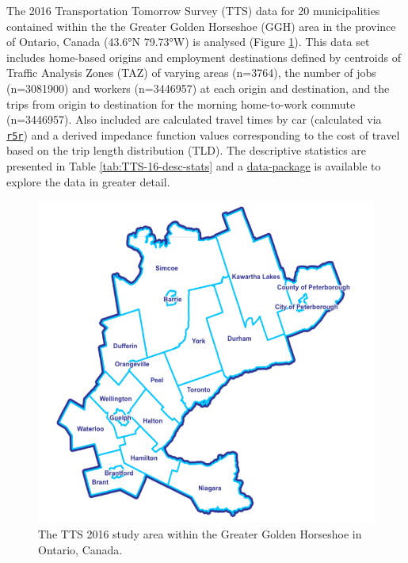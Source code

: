 \documentclass[]{elsarticle} %
\begin{document}
The 2016 Transportation Tomorrow Survey (TTS) data for 20 municipalities
contained within the the Greater Golden Horseshoe (GGH) area in the
province of Ontario, Canada (43.6°N 79.73°W) is analysed (Figure
\ref{fig:TTS-16-survey-area}). This data set includes home-based origins
and employment destinations defined by centroids of Traffic Analysis
Zones (TAZ) of varying areas (n=3764), the number of jobs (n=3081900)
and workers (n=3446957) at each origin and destination, and the trips
from origin to destination for the morning home-to-work commute
(n=3446957). Also included are calculated travel times by car
(calculated via \href{https://github.com/ipeaGIT/r5r}{\texttt{r5r}}) and
a derived impedance function values corresponding to the cost of travel
based on the trip length distribution (TLD). The descriptive statistics
are presented in Table \ref{tab:TTS-16-desc-stats} and a
\href{https://github.com/soukhova/AccessPack}{data-package} is available
to explore the data in greater detail.

\begin{figure}

{\centering \includegraphics[width=0.7\linewidth]{images/Greater-Golden-Horseshoe-Map} 

}

\caption{\label{fig:TTS-16-survey-area}The TTS 2016 study area within the Greater Golden Horseshoe in Ontario, Canada.}\label{fig:TTS-16-survey-area}
\end{figure}
\end{document}
